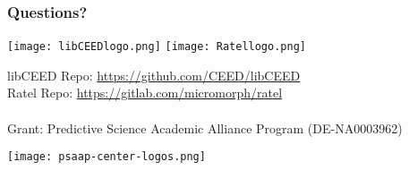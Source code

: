 \documentclass{beamer}
\begin{document}
\begin{frame}
\frametitle{Questions?}

\begin{center}
\texttt{[image: libCEEDlogo.png]}
\texttt{[image: Ratellogo.png]}
\end{center}

{\flushleft

libCEED Repo: \href{https://github.com/CEED/libCEED}{https://github.com/CEED/libCEED}\\
Ratel Repo: \hspace*{0.39cm} \href{https://gitlab.com/micromorph/ratel}{https://gitlab.com/micromorph/ratel}\\

~\\

Grant: Predictive Science Academic Alliance Program (DE-NA0003962)\\

}

\begin{center}
\texttt{[image: psaap-center-logos.png]}
\end{center}

\end{frame}


\begin{frame}[noframenumbering]
\titlepage %
\end{frame}

\end{document}
